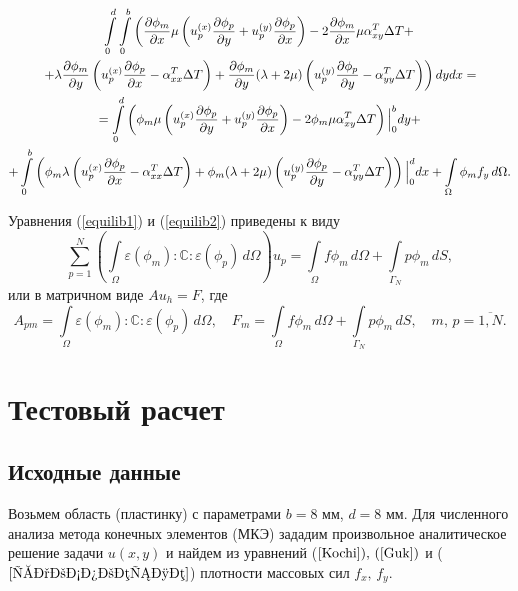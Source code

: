 \documentclass[12pt, a4paper]{article}
\begin{document}
\begin{multline}
\int\limits_0^d \int\limits_0^b \left(\frac{\partial \phi_m}{\partial x}\mu\left( u_p^{(x)}\frac{\partial \phi_p}{\partial y}+ u_p^{(y)}\frac{\partial \phi_p}{\partial x}\right)-2\frac{\partial \phi_m}{\partial x}\mu\alpha_{xy}^T\Delta T+\right.\\ \left.+\lambda\frac{\partial \phi_m}{\partial y}\left(u_p^{(x)}\frac{\partial \phi_p}{\partial x}-\alpha_{xx}^T\Delta T\right)+\frac{\partial \phi_m}{\partial y}(\lambda+2\mu)\left(u_p^{(y)}\frac{\partial \phi_p}{\partial y}-\alpha_{yy}^T\Delta T\right)\right)dydx=\\=	\int\limits_0^d \left(\phi_m\mu \left( u_p^{(x)}\frac{\partial \phi_p}{\partial y}+ u_p^{(y)}\frac{\partial \phi_p}{\partial x}\right)-2\phi_m\mu\alpha_{xy}^T\Delta T\right)\Big|_0^b dy+\\+\int\limits_0^b \left(\phi_m\lambda\left(u_p^{(x)}\frac{\partial \phi_p}{\partial x}-\alpha_{xx}^T\Delta T\right)+\phi_m(\lambda+2\mu)\left(u_p^{(y)}\frac{\partial \phi_p}{\partial y}-\alpha_{yy}^T\Delta T\right)\right)\Big|_0^d dx+\int\limits_{\Omega}\phi_m f_{y}\,d\Omega.
\label{equilib2}
\end{multline}

Уравнения (\ref{equilib1}) и (\ref{equilib2}) приведены к виду
\[
\sum\limits_{p=1}^{N}\left(\int\limits_\Omega\varepsilon(\phi_m):\mathbb{C}:\varepsilon(\phi_p)\,d\Omega\right)u_p=\int\limits_\Omega f\phi_m\,d\Omega+\int\limits_{\Gamma_N}p\phi_m \,dS,
\]
или в матричном виде $Au_h=F$, где
\[
A_{pm} = \int\limits_\Omega \varepsilon(\phi_m):\mathbb{C}:\varepsilon(\phi_p)\, d\Omega,\quad F_m=\int\limits_\Omega f \phi_m\,d\Omega+\int\limits_{\Gamma_N}p\phi_m\,dS,\quad m,\,p=\overline{1,N}.
\]
\section{Тестовый расчет}
\subsection{Исходные данные}
Возьмем область (пластинку) с параметрами $b = 8$ мм, $d = 8$ мм. Для численного анализа метода конечных элементов (МКЭ) зададим произвольное аналитическое решение задачи $u(x,y)$ и найдем из уравнений ($\ref{Kochi}),\,(\ref{Guk})$ и ($\ref{равновесие}$) плотности массовых сил $f_x,\,f_y$.
\end{document}
